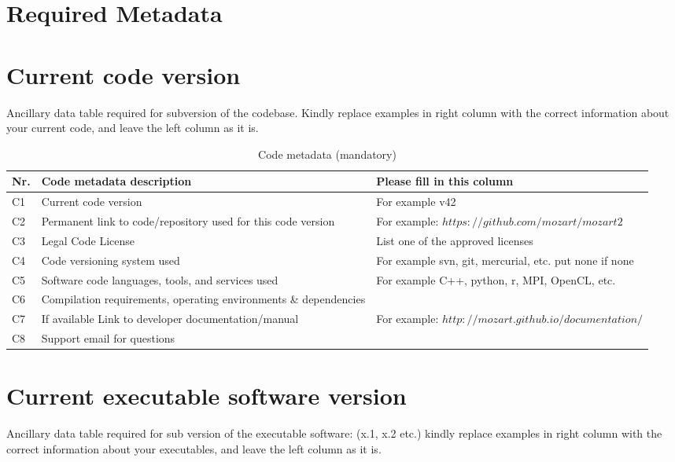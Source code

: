 \documentclass[preprint,12pt, a4paper]{elsarticle}
\begin{document}
\section*{Required Metadata}
\label{}

\section*{Current code version}
\label{}

Ancillary data table required for subversion of the codebase. Kindly replace examples in right column with the correct information about your current code, and leave the left column as it is.

\begin{table}[!h]
\begin{tabular}{|l|p{6.5cm}|p{6.5cm}|}
\hline
\textbf{Nr.} & \textbf{Code metadata description} & \textbf{Please fill in this column} \\
\hline
C1 & Current code version & For example v42 \\
\hline
C2 & Permanent link to code/repository used for this code version & For example: $https://github.com/mozart/mozart2$ \\
\hline
C3 & Legal Code License   & List one of the approved licenses \\
\hline
C4 & Code versioning system used & For example svn, git, mercurial, etc. put none if none \\
\hline
C5 & Software code languages, tools, and services used & For example C++, python, r, MPI, OpenCL, etc. \\
\hline
C6 & Compilation requirements, operating environments \& dependencies & \\
\hline
C7 & If available Link to developer documentation/manual & For example: $http://mozart.github.io/documentation/$ \\
\hline
C8 & Support email for questions & \\
\hline
\end{tabular}
\caption{Code metadata (mandatory)}
\label{} 
\end{table}

\section*{Current executable software version}
\label{}

Ancillary data table required for sub version of the executable software: (x.1, x.2 etc.) kindly replace examples in right column with the correct information about your executables, and leave the left column as it is.
\end{document}
